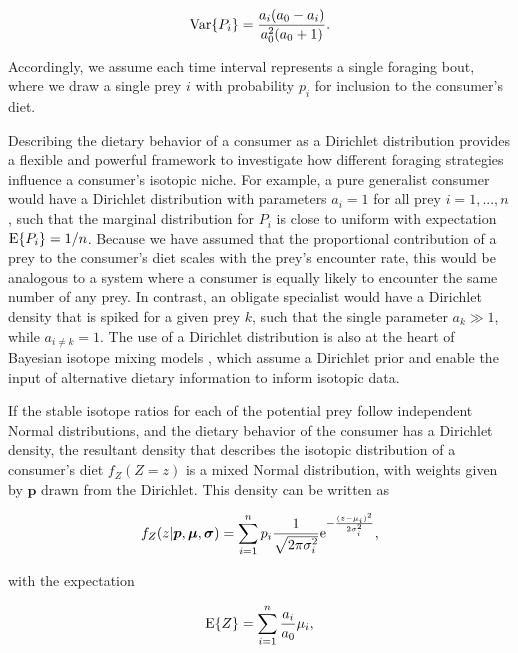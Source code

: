 \documentclass{frontiersSCNS}
\begin{document}
\begin{equation}
  \label{eqDirVar}
  {\rm Var}\{P_i\} = \frac{a_i(a_0 - a_i)}{a_0^2(a_0 + 1)}.
\end{equation}

\noindent Accordingly, we assume each time interval represents a single foraging bout, where we draw a single prey $i$ with probability $p_i$ for inclusion to the consumer's diet.

Describing the dietary behavior of a consumer as a Dirichlet distribution provides a flexible and powerful framework to investigate how different foraging strategies influence a consumer's isotopic niche.
For example, a pure generalist consumer would have a Dirichlet distribution with parameters $a_i = 1$ for all prey $i=1,...,n$, such that the marginal distribution for $P_i$ is close to uniform with expectation ${\rm E}\{P_i\} = 1/n$.
Because we have assumed that the proportional contribution of a prey to the consumer's diet scales with the prey's encounter rate, this would be analogous to a system where a consumer is equally likely to encounter the same number of any prey.
In contrast, an obligate specialist would have a Dirichlet density that is spiked for a given prey $k$, such that the single parameter $a_k \gg 1$, while $a_{i \neq k} = 1$.
The use of a Dirichlet distribution is also at the heart of Bayesian isotope mixing models \citep{Moore:2008kg,Parnell:2010ub,Hopkins:2012dza,Parnell:2012wv}, which assume a Dirichlet prior and enable the input of alternative dietary information to inform isotopic data.



If the stable isotope ratios for each of the potential prey follow independent Normal distributions, and the dietary behavior of the consumer has a Dirichlet density, the resultant density that describes the isotopic distribution of a consumer's diet $f_Z(Z=z)$ is a mixed Normal distribution, with weights given by $\bm p$ drawn from the Dirichlet.
This density can be written as

\begin{equation}
  \label{eqfZ}
f_Z(z|{\bm p},{\bm \mu},{\bm \sigma}) = \sum_{i=1}^n p_i\frac{1}{\sqrt{2 \pi \sigma_i^2}}{\rm e}^{-\frac{(z-\mu_i)^2}{2\sigma_i^2}},
\end{equation}

\noindent with the expectation

\begin{equation}
\label{eqEZ}
  {\rm E}\{Z\} = \sum_{i=1}^n \frac{a_i}{a_0} \mu_i,
\end{equation}
\end{document}
